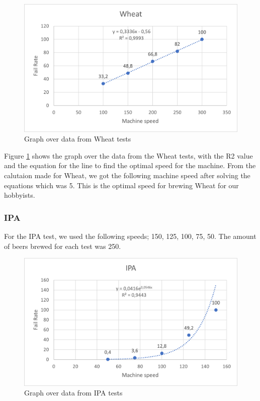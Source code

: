 \begin{center}
    \centering
    \begin{figure}[H]
        \includegraphics[width=1\textwidth]{img/Wheat_graph.png}
        \caption{Graph over data from Wheat tests}
        \label{fig:Wheat_graph}
    \end{figure}
\end{center}

Figure \ref{fig:Wheat_graph} shows the graph over the data from the Wheat tests, with the R2 value and the equation for the line to find the optimal speed for the machine. \newline
From the calutaion made for Wheat, we got the following machine speed after solving the equations which was 5. This is the optimal speed for brewing Wheat for our hobbyists. \newline

\subsubsection{IPA}
For the IPA test, we used the following speeds; 150, 125, 100, 75, 50. The amount of beers brewed for each test was 250.

\begin{center}
    \centering
    \begin{figure}[H]
        \includegraphics[width=1\textwidth]{img/IPA_graph.png}
        \caption{Graph over data from IPA tests}
        \label{fig:IPA_graph}
    \end{figure}
\end{center}


